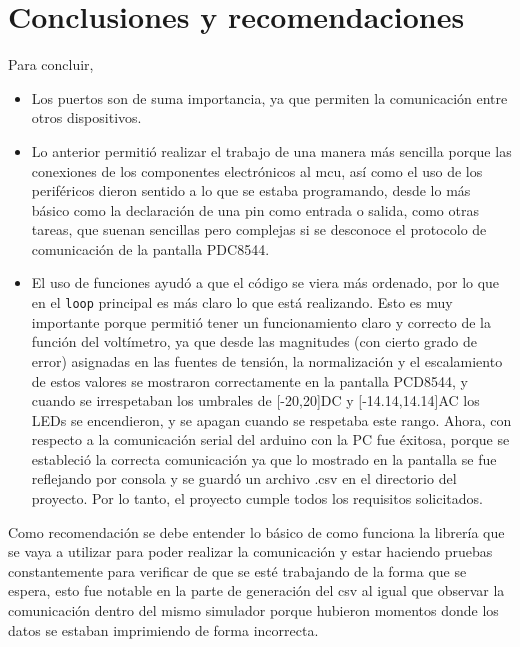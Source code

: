\section{Conclusiones y recomendaciones}
Para concluir,
\begin{itemize}
    \item Los puertos son de suma importancia, ya que permiten la comunicación entre otros dispositivos.
    \item Lo anterior permitió realizar el trabajo de una manera más sencilla porque las conexiones de los componentes electrónicos al mcu, así como el uso de los periféricos dieron sentido a lo que se estaba programando, desde lo más básico como la declaración de una pin como entrada o salida, como otras tareas, que suenan sencillas pero complejas si se desconoce el protocolo de comunicación de la pantalla PDC8544. 
    \item El uso de funciones ayudó a que el código se viera más ordenado, por lo que en el \texttt{loop} principal es más claro lo que está realizando. Esto es muy importante porque permitió tener un funcionamiento claro y correcto de la función del voltímetro, ya que desde las magnitudes (con cierto grado de error) asignadas en las fuentes de tensión, la normalización y el escalamiento de estos valores se mostraron correctamente en la pantalla PCD8544, y cuando se irrespetaban los umbrales de [-20,20]DC y [-14.14,14.14]AC los LEDs se encendieron, y se apagan cuando se respetaba este rango. Ahora, con respecto a la comunicación serial del arduino con la PC fue éxitosa, porque se estableció la correcta comunicación ya que lo mostrado en la pantalla se fue reflejando por consola y se guardó un archivo .csv en el directorio del proyecto. Por lo tanto, el proyecto cumple todos los requisitos solicitados.
\end{itemize}
Como recomendación se debe entender lo básico de como funciona la librería que se vaya a utilizar para poder realizar la comunicación y estar haciendo pruebas constantemente para verificar de que se esté trabajando de la forma que se espera, esto fue notable en la parte de generación del csv al igual que observar la comunicación dentro del mismo simulador porque hubieron momentos donde los datos se estaban imprimiendo de forma incorrecta.